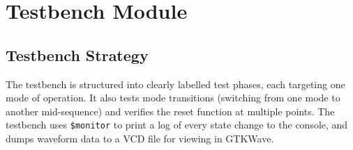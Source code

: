 \documentclass[12pt,a4paper]{report}
\begin{document}
\section{Testbench Module}

\subsection{Testbench Strategy}

The testbench is structured into clearly labelled test phases, each targeting one mode of operation. It also tests mode transitions (switching from one mode to another mid-sequence) and verifies the reset function at multiple points. The testbench uses \texttt{\$monitor} to print a log of every state change to the console, and dumps waveform data to a VCD file for viewing in GTKWave.
\end{document}

